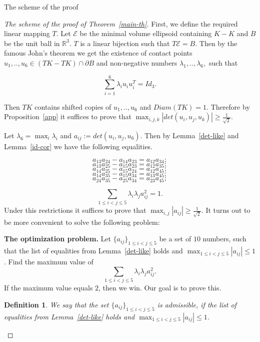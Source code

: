 \documentclass[12pt]{article}
\newtheorem{definition}{Definition}[section]
\begin{document}
\begin{section}{The scheme of the proof}

    \begin{proof}[The scheme of the proof of Theorem~\ref{main-th}]
        First, we define the required linear mapping $T$. Let $\mathcal{E}$ be the minimal volume ellipsoid containing $K-K$  and $B$ be the unit ball in $\mathbb{R}^{3}.$ $T$ is a linear bijection such that $T\mathcal{E} = B.$ Then by the famous John's theorem we get the existence of contact points $u_{1},..,u_{6}\in (TK-TK)\cap \partial B$ and non-negative numbers $\lambda_{1},..,\lambda_{6}, $ such that 

         $$
            \sum_{i=1}^{6}\lambda_{i}u_{i}u_{i}^{T} = Id_{3}.
        $$

        Then $TK$ contains shifted copies of $u_{1},..,u_{6}$ and $Diam(TK)=1$. Therefore by Proposition~\ref{app} it suffices to prove that $\max_{i,j,k}|det(u_{i},u_{j},u_{k})|\geq \frac{1}{\sqrt{2}}.$ 

        Let $\lambda_{6} = \max_{i}\lambda_{i}$ and  $a_{ij}:=det(u_{i},u_{j},u_{6}).$ Then by Lemma~\ref{det-like} and Lemma~\ref{id-cor} we have the following equalities. 

        $$
            a_{13}a_{24} - a_{14}a_{23} = a_{12}a_{34};
        $$
        $$
            a_{13}a_{25} - a_{15}a_{23} = a_{12}a_{35};
        $$
        $$
            a_{14}a_{25} - a_{15}a_{24} = a_{12}a_{45};
        $$
        $$
            a_{14}a_{35} - a_{15}a_{34} = a_{13}a_{45};
        $$
        $$
            a_{24}a_{35} - a_{25}a_{34} = a_{23}a_{45};
        $$

        $$
            \sum_{1\leq i<j\leq 5} \lambda_{i}\lambda_{j}a_{ij}^2= 1.
        $$
        Under this restrictions it suffices to prove that $\max_{i,j}|a_{ij}|\geq \frac{1}{\sqrt{2}}.$ It turns out to be more convenient to solve the following problem:

        \textbf{The optimization problem.} Let $\{a_{ij}\}_{1\leq i<j\leq 5}$ be a set of $10$ numbers, such that the list of equalities from Lemma~\ref{det-like} holds and $\max_{1\leq i<j\leq 5} |a_{ij}| \leq 1$. Find the maximum value of $$\sum_{1\leq i<j\leq 5}\lambda_{i}\lambda_{j}a_{ij}^2.$$ 
        If the maximum value equals $2$, then we win. Our goal is to prove this. 
        
    
    

    
    \begin{definition}
    We say that the set $\{a_{ij}\}_{1\leq i<j\leq 5}$ is admissible, if the list of equalities from Lemma~\ref{det-like} holds and $\max_{1\leq i<j\leq 5} |a_{ij}| \leq 1$.
\end{definition}


\end{proof}
\end{section}
\end{document}
